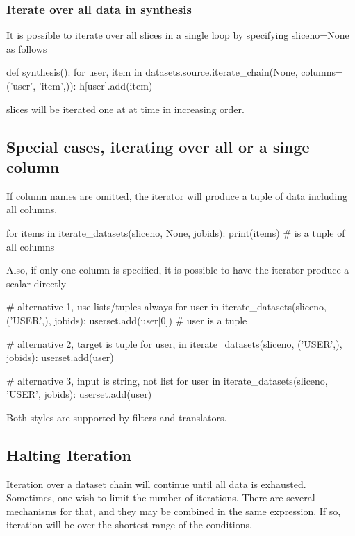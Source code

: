 \subsubsection*{Iterate over all data in synthesis}
It is possible to iterate over all slices in a single loop by
specifying sliceno=None as follows

\begin{python}
def synthesis():
    for user, item in datasets.source.iterate_chain(None, columns=('user', 'item',)):
        h[user].add(item)
\end{python}
slices will be iterated one at at time in increasing order.


\subsection{Special cases, iterating over all or a singe column}
If column names are omitted, the iterator will produce a tuple of data
including all columns.  %

\begin{python}
for items in iterate_datasets(sliceno, None, jobids):
    print(items)  # is a tuple of all columns
\end{python}
Also, if only one column is specified, it is possible to have the
iterator produce a scalar directly

\begin{python}
# alternative 1, use lists/tuples always
for user in iterate_datasets(sliceno, ('USER',), jobids):
    userset.add(user[0])  # user is a tuple

# alternative 2, target is tuple
for user, in iterate_datasets(sliceno, ('USER',), jobids):
    userset.add(user)

# alternative 3, input is string, not list
for user in iterate_datasets(sliceno, 'USER', jobids):
    userset.add(user)
\end{python}
Both styles are supported by filters and translators.




\subsection{Halting Iteration}

Iteration over a dataset chain will continue until all data is
exhausted.  Sometimes, one wish to limit the number of iterations.
There are several mechanisms for that, and they may be combined in the
same expression.  If so, iteration will be over the shortest range of
the conditions.

